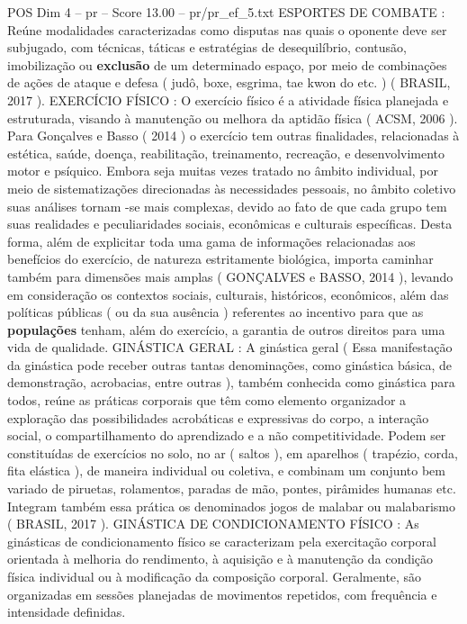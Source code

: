 \begin{textsample}{POS Dim 4 – pr – Score 13.00 – pr/pr\_ef\_5.txt}
ESPORTES DE COMBATE : Reúne modalidades caracterizadas como disputas nas quais o oponente deve ser subjugado, com técnicas, táticas e estratégias de desequilíbrio, contusão, imobilização ou \textbf{exclusão} de um determinado espaço, por meio de combinações de ações de ataque e defesa ( judô, boxe, esgrima, tae kwon do etc. ) ( BRASIL, 2017 ).
EXERCÍCIO FÍSICO : O exercício físico é a atividade física planejada e estruturada, visando à manutenção ou melhora da aptidão física ( ACSM, 2006 ).
Para Gonçalves e Basso ( 2014 ) o exercício tem outras finalidades, relacionadas à estética, saúde, doença, reabilitação, treinamento, recreação, e desenvolvimento motor e psíquico.
Embora seja muitas vezes tratado no âmbito individual, por meio de sistematizações direcionadas às necessidades pessoais, no âmbito coletivo suas análises tornam -se mais complexas, devido ao fato de que cada grupo tem suas realidades e peculiaridades sociais, econômicas e culturais específicas.
Desta forma, além de explicitar toda uma gama de informações relacionadas aos benefícios do exercício, de natureza estritamente biológica, importa caminhar também para dimensões mais amplas ( GONÇALVES e BASSO, 2014 ), levando em consideração os contextos sociais, culturais, históricos, econômicos, além das políticas públicas ( ou da sua ausência ) referentes ao incentivo para que as \textbf{populações} tenham, além do exercício, a garantia de outros direitos para uma vida de qualidade.
GINÁSTICA GERAL : A ginástica geral ( Essa manifestação da ginástica pode receber outras tantas denominações, como ginástica básica, de demonstração, acrobacias, entre outras ), também conhecida como ginástica para todos, reúne as práticas corporais que têm como elemento organizador a exploração das possibilidades acrobáticas e expressivas do corpo, a interação social, o compartilhamento do aprendizado e a não competitividade.
Podem ser constituídas de exercícios no solo, no ar ( saltos ), em aparelhos ( trapézio, corda, fita elástica ), de maneira individual ou coletiva, e combinam um conjunto bem variado de piruetas, rolamentos, paradas de mão, pontes, pirâmides humanas etc.
Integram também essa prática os denominados jogos de malabar ou malabarismo ( BRASIL, 2017 ).
GINÁSTICA DE CONDICIONAMENTO FÍSICO : As ginásticas de condicionamento físico se caracterizam pela exercitação corporal orientada à melhoria do rendimento, à aquisição e à manutenção da condição física individual ou à modificação da composição corporal.
Geralmente, são organizadas em sessões planejadas de movimentos repetidos, com frequência e intensidade definidas.

\end{textsample}
